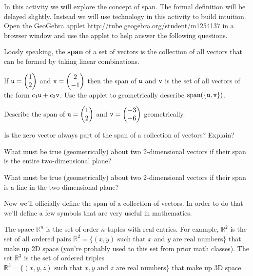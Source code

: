 % 
\begin{problem}
    In this activity we will explore the concept of span.  The formal
    definition will be delayed slightly. Instead we will use technology in this
    activity to build intuition. Open the GeoGebra applet
    \href{http://tube.geogebra.org/student/m1254137}{http://tube.geogebra.org/student/m1254137}
    in a browser window and use the applet to help answer the following questions.

    Loosly speaking, the {\bf span} of a set of vectors is the collection of all vectors that can
    be formed by taking linear combinations.  
    \ba
        \item If $\texttt{u} = \begin{pmatrix} 1 \\ 2\end{pmatrix}$ and $\texttt{v} = \begin{pmatrix} 2 \\ -1 \end{pmatrix}$ then the span of
            $\texttt{u}$ and $\texttt{v}$ is the set of all vectors of the form $c_1 \texttt{u} + c_2
            \texttt{v}$. Use the applet to geometrically describe $\text{span}(\{\texttt{u},\texttt{v}\})$.
        \item Describe the span of $\texttt{u} = \begin{pmatrix} 1 \\ 2 \end{pmatrix}$ and $\texttt{v} = \begin{pmatrix} -3 \\ -6 \end{pmatrix}$
            geometrically.
        \item Is the zero vector always part of the span of a collection of vectors?
            Explain?
        \item What must be true (geometrically) about two 2-dimensional vectors if their
            span is the entire two-dimensional plane?  
        \item What must be true (geometrically) about two 2-dimensional vectors if their
            span is a line in the two-dimensional plane?  
    \ea
\end{problem}

Now we'll officially define the span of a collection of vectors.  In order to do that
we'll define a few symbols that are very useful in mathematics.
\begin{definition}
    The space $\mathbb{R}^n$ is the set of order $n$-tuples with real entries.  For example, $\mathbb{R}^2$
    is the set of all ordered pairs $\mathbb{R}^2 = \{(x,y) \text{ such that } x \text{ and
    } y \text{ are real numbers}\}$ that make up 2D space
    (you're probably used to this set from
    prior math classes).  The set $\mathbb{R}^3$ is the set of ordered triples
    $\mathbb{R}^3 = \{(x,y,z) \text{ such that } x,y \text{ and
    } z \text{ are real numbers}\}$ that make up 3D space.
\end{definition}


